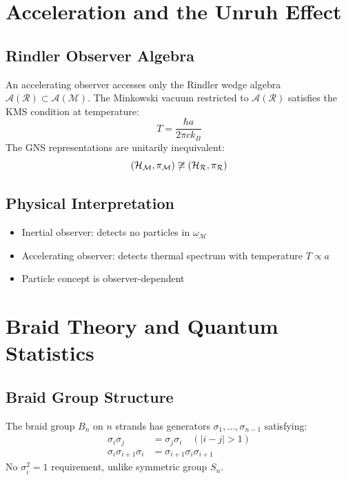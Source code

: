 \documentclass[aps,prl,reprint]{revtex4-2}
\begin{document}
\section{Acceleration and the Unruh Effect}

\subsection{Rindler Observer Algebra}

An accelerating observer accesses only the Rindler wedge algebra $\mathcal{A}%
(\mathcal{R}) \subset \mathcal{A}(\mathcal{M})$. The Minkowski vacuum
restricted to $\mathcal{A}(\mathcal{R})$ satisfies the KMS condition at
temperature: 
\begin{equation*}
T = \frac{\hbar a}{2\pi c k_B} 
\end{equation*}
The GNS representations are unitarily inequivalent: 
\begin{equation*}
(\mathcal{H}_{\mathcal{M}}, \pi_{\mathcal{M}}) \not\cong (\mathcal{H}_{%
\mathcal{R}}, \pi_{\mathcal{R}}) 
\end{equation*}

\subsection{Physical Interpretation}

\begin{itemize}
\item Inertial observer: detects no particles in $\omega_{\mathcal{M}}$

\item Accelerating observer: detects thermal spectrum with temperature $T
\propto a$

\item Particle concept is observer-dependent
\end{itemize}

\section{Braid Theory and Quantum Statistics}

\subsection{Braid Group Structure}

The braid group $B_n$ on $n$ strands has generators $\sigma_1, \ldots,
\sigma_{n-1}$ satisfying: 
\begin{align*}
\sigma_i \sigma_j &= \sigma_j \sigma_i \quad (|i-j| > 1) \\
\sigma_i \sigma_{i+1} \sigma_i &= \sigma_{i+1} \sigma_i \sigma_{i+1}
\end{align*}
No $\sigma_i^2 = 1$ requirement, unlike symmetric group $S_n$.
\end{document}
